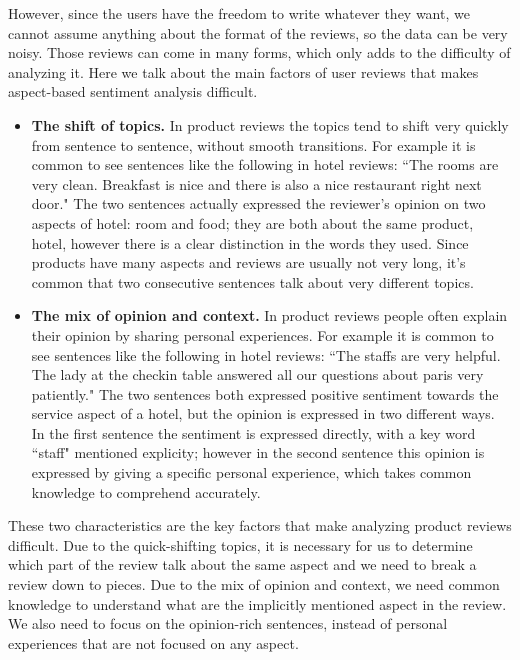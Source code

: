 However, since the users have the freedom to write whatever they want, we cannot assume anything about the format of the reviews, so the data can be very noisy. Those reviews can come in many forms, which only adds to the difficulty of analyzing it. Here we talk about the main factors of user reviews that makes aspect-based sentiment analysis difficult.

\begin{itemize}
    \item \textbf{The shift of topics.} In product reviews the topics tend to shift very quickly from sentence to sentence, without smooth transitions. For example it is common to see sentences like the following in hotel reviews: ``The rooms are very clean. Breakfast is nice and there is also a nice restaurant right next door." The two sentences actually expressed the reviewer's opinion on two aspects of hotel: room and food; they are both about the same product, hotel, however there is a clear distinction in the words they used. Since products have many aspects and reviews are usually not very long, it's common that two consecutive sentences talk about very different topics.
    \item \textbf{The mix of opinion and context.} In product reviews people often explain their opinion by sharing personal experiences. For example it is common to see sentences like the following in hotel reviews: ``The staffs are very helpful. The lady at the checkin table answered all our questions about paris very patiently." The two sentences both expressed positive sentiment towards the service aspect of a hotel, but the opinion is expressed in two different ways. In the first sentence the sentiment is expressed directly, with a key word ``staff" mentioned explicity; however in the second sentence this opinion is expressed by giving a specific personal experience, which takes common knowledge to comprehend accurately.
\end{itemize}

These two characteristics are the key factors that make analyzing product reviews difficult. Due to the quick-shifting topics, it is necessary for us to determine which part of the review talk about the same aspect and we need to break a review down to pieces. Due to the mix of opinion and context, we need common knowledge to understand what are the implicitly mentioned aspect in the review. We also need to focus on the opinion-rich sentences, instead of personal experiences that are not focused on any aspect.
